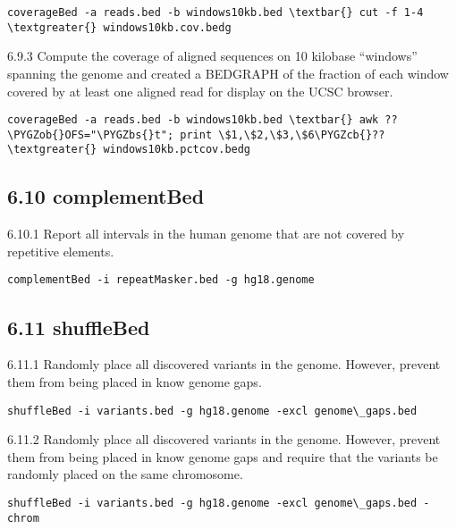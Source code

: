 \documentclass[letterpaper,10pt,english]{sphinxmanual}
\def\PYGZbs{\char`\\}
\def\PYGZob{\char`\{}
\def\PYGZcb{\char`\}}
\begin{document}
\begin{Verbatim}[commandchars=\\\{\}]
coverageBed -a reads.bed -b windows10kb.bed \textbar{} cut -f 1-4 \textgreater{} windows10kb.cov.bedg
\end{Verbatim}

6.9.3 Compute the coverage of aligned sequences on 10 kilobase ``windows'' spanning the
genome and created a BEDGRAPH of the fraction of each window covered by at least
one aligned read for display on the UCSC browser.

\begin{Verbatim}[commandchars=\\\{\}]
coverageBed -a reads.bed -b windows10kb.bed \textbar{} awk ??\PYGZob{}OFS="\PYGZbs{}t"; print \$1,\$2,\$3,\$6\PYGZcb{}??
\textgreater{} windows10kb.pctcov.bedg
\end{Verbatim}


\subsection{6.10 complementBed}
\label{content/example-usage:complementbed}
6.10.1 Report all intervals in the human genome that are not covered by repetitive
elements.

\begin{Verbatim}[commandchars=\\\{\}]
complementBed -i repeatMasker.bed -g hg18.genome
\end{Verbatim}


\subsection{6.11 shuffleBed}
\label{content/example-usage:shufflebed}
6.11.1 Randomly place all discovered variants in the genome. However, prevent them
from being placed in know genome gaps.

\begin{Verbatim}[commandchars=\\\{\}]
shuffleBed -i variants.bed -g hg18.genome -excl genome\_gaps.bed
\end{Verbatim}

6.11.2 Randomly place all discovered variants in the genome. However, prevent them
from being placed in know genome gaps and require that the variants be randomly
placed on the same chromosome.

\begin{Verbatim}[commandchars=\\\{\}]
shuffleBed -i variants.bed -g hg18.genome -excl genome\_gaps.bed -chrom
\end{Verbatim}
\end{document}
